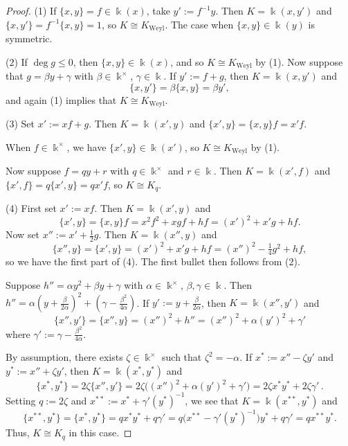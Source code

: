 \documentclass[12pt]{amsart}
\theoremstyle{plain}
\numberwithin{theorem}{section}
\numberwithin{equation}{theorem}
\theoremstyle{definition}
\DeclareMathOperator{\Weyl}{Weyl}
\newcommand \Kweyl {K_{\Weyl}}
\newcommand \kx {\Bbbk^\times}
\begin{document}
\begin{proof}
(1) If $\{x,y\} = f \in \Bbbk(x)$, 
take $y' := f^{-1} y$. Then 
$K = \Bbbk(x,y')$ and $\{x,y'\} 
= f^{-1} \{x,y\} = 1$, so 
$K \cong \Kweyl$. The case when 
$\{x,y\} \in \Bbbk(y)$ is symmetric.

(2) If $\deg g \le 0$, then 
$\{x,y\} \in \Bbbk(x)$, and so  
$K \cong \Kweyl$ by (1). Now suppose 
that $g = \beta y + \gamma$ with 
$\beta \in \kx$, $\gamma \in \Bbbk$. 
If $y' := f+g$, then $K = \Bbbk(x,y')$ 
and 
$$\{x,y'\} = \beta \{x,y\} = \beta y',$$
and again (1) implies that 
$K \cong \Kweyl$.

(3) Set $x' := xf+g$. Then $K = 
\Bbbk(x',y)$ and $\{x',y\} = 
\{x,y\} f = x' f$.

When $f \in \kx$, we have $\{x',y\} 
\in \Bbbk(x')$, so $K \cong \Kweyl$ 
by (1).

Now suppose $f = qy+r$ with $q \in 
\kx$ and $r \in \Bbbk$. Then $K = 
\Bbbk(x',f)$ and $\{x',f\} = 
q \{x',y\} = q x' f$, so $K \cong K_q$.

(4) First set $x' := x f$. Then 
$K = \Bbbk(x',y)$ and 
$$\{x',y\} = \{x,y\} f = x^2 f^2 
+ x gf + hf = (x')^2 + x' g + hf.$$
Now set $x'' := x' + \frac12 g$. Then 
$K = \Bbbk(x'',y)$ and 
$$\{x'',y\} = \{x',y\} = (x')^2 
+ x' g + hf = (x'')^2 - \tfrac14 g^2 + hf,$$
so we have the first part of (4).
The first bullet then follows from (2).

Suppose $h'' = \alpha y^2 + \beta y 
+ \gamma$ with $\alpha \in \kx$, 
$\beta,\gamma \in \Bbbk$. Then 
$h'' = \alpha ( y + \frac\beta{2\alpha} )^2 
+ ( \gamma - \frac{\beta^2}{4\alpha})$. 
If $y' := y + \frac\beta{2\alpha}$, then 
$K = \Bbbk(x'',y')$ and 
$$\{x'',y'\} = \{x'',y\} 
= (x'')^2 + h'' 
= (x'')^2 + \alpha (y')^2 + \gamma'$$
where $\gamma' := \gamma - 
\frac{\beta^2}{4\alpha}$. 

By assumption, there exists 
$\zeta \in \kx$ such that $\zeta^2 
= - \alpha$. If $x^* := x'' - \zeta y'$ 
and $y^* := x'' + \zeta y'$, then 
$K = \Bbbk(x^*,y^*)$ and
$$\{x^*,y^*\} = 2 \zeta \{x'',y'\} 
= 2 \zeta \bigl( (x'')^2 + \alpha (y')^2 
+ \gamma' \bigr) 
= 2 \zeta x^* y^* + 2 \zeta \gamma' \,.$$
Setting $q := 2 \zeta$ and 
$x^{**} := x^* + \gamma' (y^*)^{-1}$, we 
see that $K = \Bbbk(x^{**},y^*)$ and
$$\{x^{**},y^*\} = \{x^*,y^*\} 
= q x^* y^* + q \gamma' 
= q \bigl( x^{**} -  \gamma' (y^*)^{-1} \bigr) 
y^* + q \gamma' = q x^{**} y^*.$$
Thus, $K \cong K_q$ in this case.
\end{proof}
\end{document}
